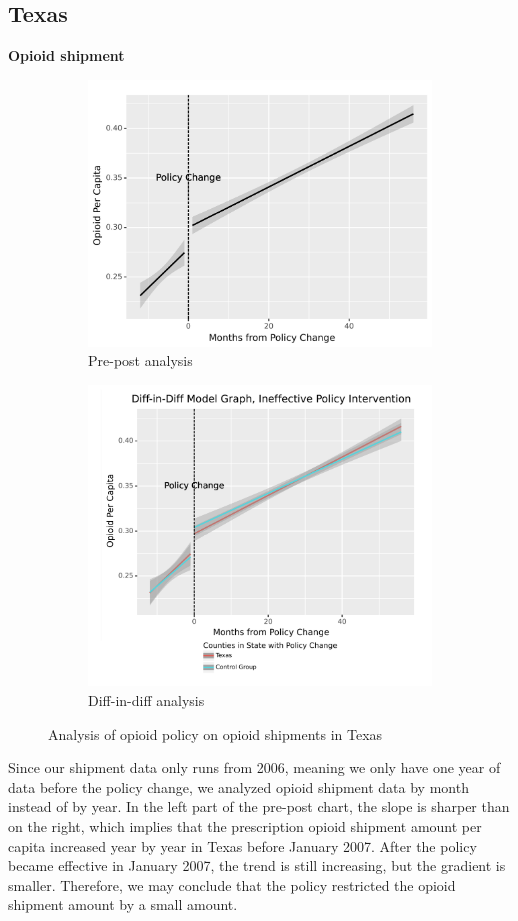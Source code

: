 \documentclass[12pt,letterpaper]{article}
\begin{document}
\subsection{Texas}
\textbf{Opioid shipment}

\begin{figure}[!h]
\centering
\begin{subfigure}{.5\textwidth}
  \centering
  \includegraphics[width=0.7\linewidth]{../30_results/Bonus_Results/tx_monthly_prepost_successful.png}
  \caption{Pre-post analysis}
  \label{fig:tx_ship_prepost}
\end{subfigure}%
\begin{subfigure}{.55\textwidth}
  \centering
  \includegraphics[width=0.7\linewidth]{../30_results/Bonus_Results/tx_monthly_did_notsure.png}
  \caption{Diff-in-diff analysis}
  \label{fig:tx_ship_did}
\end{subfigure}
\caption{Analysis of opioid policy on opioid shipments in Texas}
\label{fig:tx_ship}
\end{figure}
Since our shipment data only runs from 2006, meaning we only have one year of data before the policy change, we analyzed opioid shipment data by month instead of by year. In the left part of the pre-post chart, the slope is sharper than on the right, which implies that the prescription opioid shipment amount per capita increased year by year in Texas before January 2007. After the policy became effective in January 2007, the trend is still increasing, but the gradient is smaller. Therefore, we may conclude that the policy restricted the opioid shipment amount by a small amount.
\end{document}
